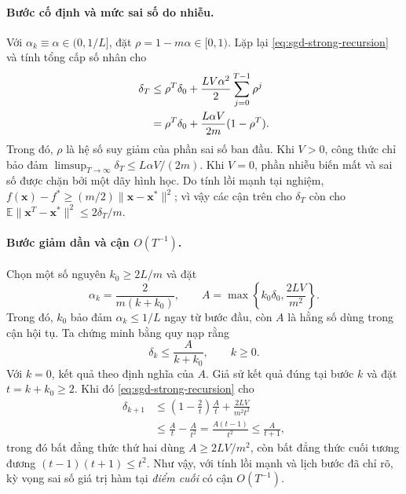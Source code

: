 \paragraph{Bước cố định và mức sai số do nhiễu.}
Với $\alpha_k\equiv\alpha\in(0,1/L]$, đặt $\rho=1-m\alpha\in[0,1)$.
Lặp lại \eqref{eq:sgd-strong-recursion} và tính tổng cấp số nhân cho
\begin{align}
 \delta_T
 &\leq\rho^T\delta_0+\frac{LV\alpha^2}{2}
                    \sum_{j=0}^{T-1}\rho^j\notag\\
 &=\rho^T\delta_0+
        \frac{L\alpha V}{2m}(1-\rho^T).
 \label{eq:sgd-strong-fixed}
\end{align}
Trong đó, $\rho$ là hệ số suy giảm của phần sai số ban đầu.
Khi $V>0$, công thức chỉ bảo đảm
$\limsup_{T\to\infty}\delta_T\leq L\alpha V/(2m)$.
Khi $V=0$, phần nhiễu biến mất và sai số được chặn bởi một dãy hình học.
Do tính lồi mạnh tại nghiệm,
$f(\mathbf{x})-f^{*}\geq(m/2)\|\mathbf{x}-\mathbf{x}^{*}\|^2$;
vì vậy các cận trên cho $\delta_T$ còn cho
$\mathbb{E}\|\mathbf{x}^{T}-\mathbf{x}^{*}\|^2\leq2\delta_T/m$.

\paragraph{Bước giảm dần và cận $O(T^{-1})$.}
Chọn một số nguyên $k_0\geq2L/m$ và đặt
\begin{equation}
 \alpha_k=\frac{2}{m(k+k_0)},\qquad
 A=\max\left\{k_0\delta_0,\frac{2LV}{m^2}\right\}.
 \label{eq:sgd-strong-schedule}
\end{equation}
Trong đó, $k_0$ bảo đảm $\alpha_k\leq1/L$ ngay từ bước đầu,
còn $A$ là hằng số dùng trong cận hội tụ. Ta chứng minh bằng quy nạp rằng
\begin{equation}
 \delta_k\leq\frac{A}{k+k_0},\qquad k\geq0.
 \label{eq:sgd-strong-decreasing}
\end{equation}
Với $k=0$, kết quả theo định nghĩa của $A$. Giả sử kết quả đúng tại
bước $k$ và đặt $t=k+k_0\geq2$. Khi đó \eqref{eq:sgd-strong-recursion}
cho
\begin{align*}
 \delta_{k+1}
 &\leq\left(1-\frac{2}{t}\right)\frac{A}{t}
       +\frac{2LV}{m^2t^2}\\
 &\leq\frac{A}{t}-\frac{A}{t^2}
 =\frac{A(t-1)}{t^2}
 \leq\frac{A}{t+1},
\end{align*}
trong đó bất đẳng thức thứ hai dùng $A\geq2LV/m^2$, còn bất đẳng thức
cuối tương đương $(t-1)(t+1)\leq t^2$.
Như vậy, với tính lồi mạnh và lịch bước đã chỉ rõ, kỳ vọng sai số giá trị
hàm tại \emph{điểm cuối} có cận $O(T^{-1})$.

